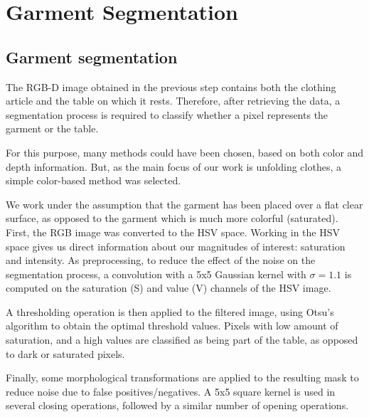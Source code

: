 \chapter{Garment Segmentation}
\label{garment_segmentation}

\section{Garment segmentation}
\label{garment_segmentation_mask}

The RGB-D image obtained in the previous step contains both the clothing article and the table on which it rests. Therefore, after retrieving the data, a segmentation process is required to classify whether a pixel represents the garment or the table.

For this purpose, many methods could have been chosen, based on both color and depth information. But, as the main focus of our work is unfolding clothes, a simple color-based method was selected. 

We work under the assumption that the garment has been placed over a flat clear surface, as opposed to the garment which is much more colorful (saturated). First, the RGB image was converted to the HSV space. Working in the HSV space gives us direct information about our magnitudes of interest: saturation and intensity. As preprocessing, to reduce the effect of the noise on the segmentation process, a convolution with a 5x5 Gaussian kernel with $\sigma=1.1$ is computed on the saturation (S) and value (V) channels of the HSV image.

A thresholding operation is then applied to the filtered image, using Otsu's algorithm  to obtain the optimal threshold values. Pixels with low amount of saturation, and a high values are classified as being part of the table, as opposed to dark or saturated pixels.

Finally, some morphological transformations are applied to the resulting mask to reduce noise due to false positives/negatives. A 5x5 square kernel is used in several closing operations, followed by a similar number of opening operations.


